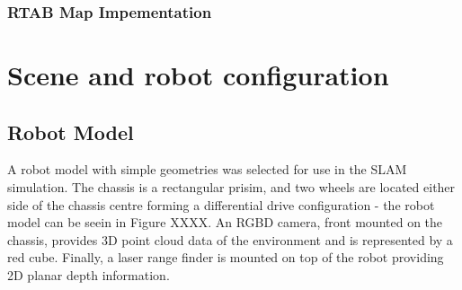 \documentclass[a4paper]{article}
\begin{document}
\subsubsection{RTAB Map Impementation}


\section{Scene and robot configuration}
\subsection{Robot Model}
A robot model with simple geometries was selected for use in the SLAM simulation. The chassis is a rectangular prisim, and two wheels are located either side of the chassis centre forming a differential drive configuration - the robot model can be seein in Figure XXXX. An RGBD camera, front mounted on the chassis, provides 3D point cloud data of the environment and is represented by a red cube. Finally, a laser range finder is mounted on top of the robot providing 2D planar depth information.\\
\end{document}
